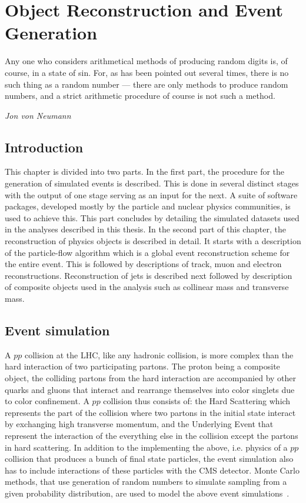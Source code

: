 \chapter{Object Reconstruction and Event Generation}
\label{chap:event_sim}
\epigraph{Any one who considers arithmetical methods of producing random digits is, of course, in a state of sin. For, as has been pointed out several times, there is no such thing as a random number --- there are only methods to produce random numbers, and a strict arithmetic procedure of course is not such a method.}{\textit{Jon von Neumann}}
\vskip 0.5in
\section{Introduction}
\label{intro}
This chapter is divided into two parts. In the first part, the procedure for the generation of simulated events is described. This is done in several distinct stages with the output of one stage serving as an input for the next. A suite of software packages, developed mostly by the particle and nuclear physics communities, is used to achieve this. This part concludes by detailing the simulated datasets used in the analyses described in this thesis. In the second part of this chapter, the reconstruction of physics objects is described in detail. It starts with a description of the particle-flow algorithm which is a global event reconstruction scheme for the entire event. This is followed by descriptions of track, muon and electron reconstructions. Reconstruction of jets is described next followed by description of composite objects used in the analysis such as collinear mass and transverse mass.
 

\section{Event simulation}
A $pp$ collision at the LHC, like any hadronic collision, is more complex than the hard interaction of two participating partons. The proton being a composite object, the colliding partons from the hard interaction are accompanied by other quarks and gluons that interact and rearrange themselves into color singlets due to color confinement. A $pp$ collision thus consists of: the Hard Scattering which represents the part of the collision where two partons in the initial state interact by exchanging high transverse momentum, and the Underlying Event that represent the interaction of the everything else in the collision except the partons in hard scattering. In addition to the implementing the above, i.e. physics of a $pp$ collision  that produces a bunch of final state particles, the event simulation also has to include interactions of these particles with the CMS detector. Monte Carlo methods, that use generation of random numbers to simulate sampling from a given probability distribution, are used to model the above event simulations~\cite{mc_evtsim}.

